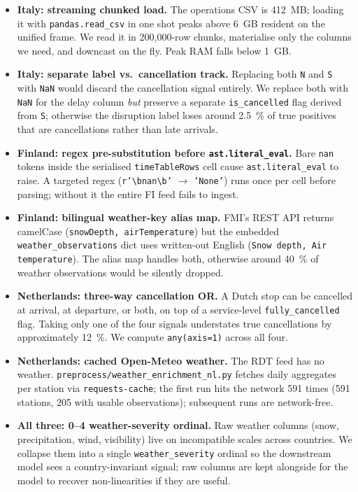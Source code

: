 \begin{itemize}[leftmargin=*]
    \item \textbf{Italy: streaming chunked load.} The operations CSV is \SI{412}{MB}; loading it with \texttt{pandas.read\_csv} in one shot peaks above \SI{6}{GB} resident on the unified frame. We read it in 200{,}000-row chunks, materialise only the columns we need, and downcast on the fly. Peak RAM falls below \SI{1}{GB}.
    \item \textbf{Italy: separate label vs.\ cancellation track.} Replacing both \texttt{N} and \texttt{S} with \texttt{NaN} would discard the cancellation signal entirely. We replace both with \texttt{NaN} for the delay column \emph{but} preserve a separate \texttt{is\_cancelled} flag derived from \texttt{S}; otherwise the disruption label loses around \SI{2.5}{\percent} of true positives that are cancellations rather than late arrivals.
    \item \textbf{Finland: regex pre-substitution before \texttt{ast.literal\_eval}.} Bare \texttt{nan} tokens inside the serialised \texttt{timeTableRows} cell cause \texttt{ast.literal\_eval} to raise. A targeted regex (\texttt{r'\textbackslash bnan\textbackslash b'} $\to$ \texttt{'None'}) runs once per cell before parsing; without it the entire FI feed fails to ingest.
    \item \textbf{Finland: bilingual weather-key alias map.} FMI's REST API returns camelCase (\texttt{snowDepth, airTemperature}) but the embedded \texttt{weather\_observations} dict uses written-out English (\texttt{Snow depth, Air temperature}). The alias map handles both, otherwise around \SI{40}{\percent} of weather observations would be silently dropped.
    \item \textbf{Netherlands: three-way cancellation OR.} A Dutch stop can be cancelled at arrival, at departure, or both, on top of a service-level \texttt{fully\_cancelled} flag. Taking only one of the four signals understates true cancellations by approximately \SI{12}{\percent}. We compute \texttt{any(axis=1)} across all four.
    \item \textbf{Netherlands: cached Open-Meteo weather.} The RDT feed has no weather. \texttt{preprocess/weather\_enrichment\_nl.py} fetches daily aggregates per station via \texttt{requests-cache}; the first run hits the network 591 times (591 stations, 205 with usable observations); subsequent runs are network-free.
    \item \textbf{All three: 0--4 weather-severity ordinal.} Raw weather columns (snow, precipitation, wind, visibility) live on incompatible scales across countries. We collapse them into a single \texttt{weather\_severity} ordinal so the downstream model sees a country-invariant signal; raw columns are kept alongside for the model to recover non-linearities if they are useful.
\end{itemize}

